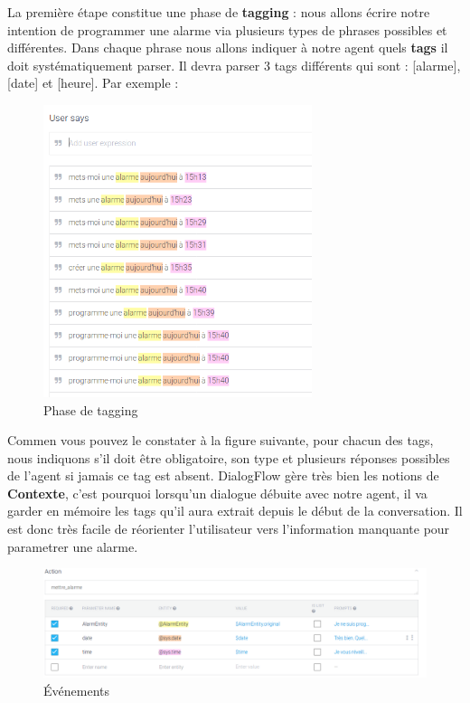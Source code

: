 La première étape constitue une phase de \textbf{tagging} : nous allons écrire notre intention de programmer une alarme via plusieurs types de phrases possibles et différentes.
Dans chaque phrase nous allons indiquer à notre agent quels \textbf{tags} il doit systématiquement parser. Il devra parser 3 tags différents qui sont : [alarme], [date] et 
[heure]. Par exemple :

\begin{figure}[H]
    \centering
        \centering
        \includegraphics[width=0.7\textwidth]{images/intents.png}
        \caption{Phase de tagging}
\end{figure}

Commen vous pouvez le constater à la figure suivante, pour chacun des tags, nous indiquons s'il doit être obligatoire, son type et plusieurs réponses possibles de l'agent si jamais ce tag est absent. DialogFlow gère 
très bien les notions de \textbf{Contexte}, c'est pourquoi lorsqu'un dialogue débuite avec notre agent, il va garder en mémoire les tags qu'il aura extrait depuis le 
début de la conversation. Il est donc très facile de réorienter l'utilisateur vers l'information manquante pour parametrer une alarme. 

\begin{figure}[H]
    \centering
        \centering
        \includegraphics[width=1.2\textwidth]{images/action.png}
        \caption{Événements}
\end{figure}

